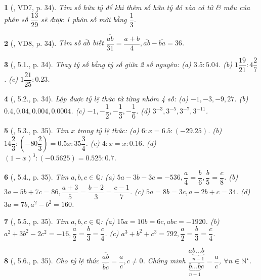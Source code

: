\documentclass{article}
\newtheorem{baitoan}{}
\begin{document}
\begin{baitoan}[\cite{Binh_boi_duong_Toan_7_tap_1}, VD7, p. 34]
	Tìm số hữu tỷ để khi thêm số hữu tỷ đó vào cả tử \& mẫu của phân số $\dfrac{13}{29}$ sẽ được 1 phân số mới bằng $\dfrac{1}{3}$.
\end{baitoan}

\begin{baitoan}[\cite{Binh_boi_duong_Toan_7_tap_1}, VD8, p. 34]
	Tìm số $\overline{ab}$ biết $\dfrac{\overline{ab}}{31} = \dfrac{a + b}{4},\overline{ab} - \overline{ba} = 36$.
\end{baitoan}

\begin{baitoan}[\cite{Binh_boi_duong_Toan_7_tap_1}, 5.1., p. 34]
	Thay tỷ số bằng tỷ số giữa 2 số nguyên: (a) $3.5:5.04$. (b) $1\dfrac{19}{21}:4\dfrac{2}{7}$. (c) $1\dfrac{21}{25}:0.23$.
\end{baitoan}

\begin{baitoan}[\cite{Binh_boi_duong_Toan_7_tap_1}, 5.2., p. 34]
	Lập được tỷ lệ thức từ từng nhóm 4 số: (a) $-1,-3,-9,27$. (b) $0.4,0.04,0.004,0.0004$. (c) $-1,-\dfrac{1}{2},-\dfrac{1}{3},-\dfrac{1}{6}$. (d) $3^{-3},3^{-5},3^{-7},3^{-11}$.
\end{baitoan}

\begin{baitoan}[\cite{Binh_boi_duong_Toan_7_tap_1}, 5.3., p. 35]
	Tìm $x$ trong tỷ lệ thức: (a) $6:x = 6.5:(-29.25)$. (b) $14\dfrac{2}{3}:\left(-80\dfrac{2}{3}\right) = 0.5x:35\dfrac{3}{4}$. (c) $4:x = x:0.16$. (d) $(1 - x)^3:(-0.5625) = 0.525:0.7$.
\end{baitoan}

\begin{baitoan}[\cite{Binh_boi_duong_Toan_7_tap_1}, 5.4., p. 35]
	Tìm $a,b,c\in\mathbb{Q}$: (a) $5a - 3b - 3c = -536,\dfrac{a}{4} = \dfrac{b}{6},\dfrac{b}{5} = \dfrac{c}{8}$. (b) $3a - 5b + 7c = 86,\dfrac{a + 3}{5} = \dfrac{b - 2}{3} = \dfrac{c - 1}{7}$. (c) $5a = 8b = 3c,a - 2b + c = 34$. (d) $3a = 7b,a^2 - b^2 = 160$.
\end{baitoan}

\begin{baitoan}[\cite{Binh_boi_duong_Toan_7_tap_1}, 5.5., p. 35]
	Tìm $a,b,c\in\mathbb{Q}$: (a) $15a = 10b = 6c,abc = -1920$. (b) $a^2 + 3b^2 - 2c^2 = -16,\dfrac{a}{2} = \dfrac{b}{3} = \dfrac{c}{4}$. (c) $a^3 + b^2 + c^3 = 792,\dfrac{a}{2} = \dfrac{b}{3} = \dfrac{c}{4}$.
\end{baitoan}

\begin{baitoan}[\cite{Binh_boi_duong_Toan_7_tap_1}, 5.6., p. 35]
	Cho tỷ lệ thức $\dfrac{\overline{ab}}{\overline{bc}} = \dfrac{a}{c},c\ne0$. Chứng minh $\dfrac{a\underbrace{b\ldots b}_{n-1}}{\underbrace{b\ldots b}_{n-1}c} = \dfrac{a}{c}$, $\forall n\in\mathbb{N}^\star$.
\end{baitoan}
\end{document}
